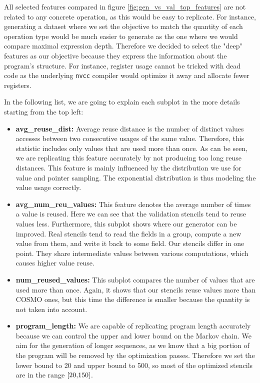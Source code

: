 \documentclass[sigplan,\review anonymous]{acmart}
\begin{document}
All selected features compared in figure \ref{fig:gen_vs_val_top_features}
are not related to any concrete operation, as this would be easy to replicate.
For instance, generating a dataset where we set the objective to match the
quantity of each operation type would be much easier to generate as the one
where we would compare maximal expression depth. Therefore we decided to
select the "deep" features as our objective because they express the
information about the program's structure. For instance, register usage
cannot be tricked with dead code as the underlying \texttt{nvcc} compiler
would optimize it away and allocate fewer registers.

In the following list, we are going to explain each subplot in the more
details starting from the top left:
\begin{itemize}
  \item \textbf{avg\_reuse\_dist:} Average reuse distance is the number of
  distinct values accesses between two consecutive usages of the same value.
  Therefore, this statistic includes only values that are used more than once.
  As can be seen, we are replicating this feature accurately by not producing
  too long reuse distances. This feature is mainly influenced by the
  distribution we use for value and pointer sampling. The exponential
  distribution is thus modeling the value usage correctly.

  \item \textbf{avg\_num\_reu\_values:} This feature denotes the average number
  of times a value is reused. Here we can see that the validation stencils
  tend to reuse values less. Furthermore, this subplot shows where our
  generator can be improved. Real stencils tend to read the fields in a group,
  compute a new value from them, and write it back to some field. Our stencils
  differ in one point. They share intermediate values between various
  computations, which causes higher value reuse.

  \item \textbf{num\_reused\_values:}  This subplot compares the number of
  values that are used more than once. Again, it shows that our stencils
  reuse values more than COSMO ones, but this time the difference is smaller
  because the quantity is not taken into account.

  \item \textbf{program\_length:} We are capable of replicating program
  length accurately because we can control the upper and lower bound on
  the Markov chain. We aim for the generation of longer sequences, as we
  know that a big portion of the program will be removed by the optimization
  passes. Therefore we set the lower bound to 20 and upper bound to 500, so
  most of the optimized stencils are in the range $\interval[{20, 150}]$.


\end{itemize}
\end{document}
